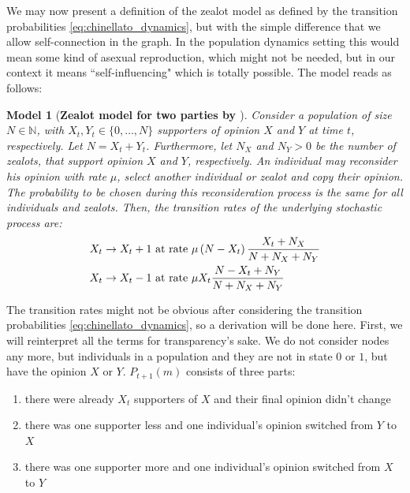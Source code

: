 \documentclass[12pt,a4paper,twoside]{article}
\newtheorem{model}{Model}[section]
\begin{document}
We may now present a definition of the zealot model as defined by the transition probabilities \eqref{eq:chinellato_dynamics}, but with the simple difference that we allow self-connection in the graph. In the population dynamics setting this would mean some kind of asexual reproduction, which might not be needed, but in our context it means ``self-influencing" which is totally possible. The model reads as follows:
\begin{model}[\textbf{Zealot model for two parties by \cite{Aguiar2011, Chinellato2015, Braha2017}}]\label{model:zealot}
Consider a population of size $N \in \mathbb{N}$, with $X_t, Y_t \in \lbrace 0,\dots,N\rbrace$ supporters of opinion $X$ and $Y$ at time $t$, respectively. Let $N = X_t + Y_t$. Furthermore, let $N_X$ and $N_Y > 0$ be the number of zealots, that support opinion $X$ and $Y$, respectively. An individual may reconsider his opinion with rate $\mu$, select another individual or zealot and copy their opinion. The probability to be chosen during this reconsideration process is the same for all individuals and zealots. Then, the transition rates of the underlying stochastic process are:
\begin{align}\label{def:transition_rates_zealot}
	\begin{split}
	X_t \rightarrow X_t + 1 & \textnormal{ at rate } \mu\left(N-X_t\right)\frac{X_t + N_X}{N + N_X + N_Y} \\
	X_t \rightarrow X_t - 1 & \textnormal{ at rate } \mu X_t\frac{N-X_t+N_Y}{N+N_X+N_Y}
	\end{split}
\end{align}
\end{model}

The transition rates might not be obvious after considering the transition probabilities \eqref{eq:chinellato_dynamics}, so a derivation will be done here. First, we will reinterpret all the terms for transparency's sake. We do not consider nodes any more, but individuals in a population and they are not in state $0$ or $1$, but have the opinion $X$ or $Y$. $P_{t+1}\left(m\right)$ consists of three parts: 
\begin{enumerate}
	\item there were already $X_t$ supporters of $X$ and their final opinion didn't change
	\item there was one supporter less and one individual's opinion switched from $Y$ to $X$
	\item there was one supporter more and one individual's opinion switched from $X$ to $Y$
\end{enumerate}
\end{document}
